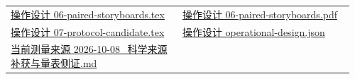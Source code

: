 \documentclass[11pt,a4paper]{article}
\begin{document}
\begin{minipage}{\linewidth}
\begin{tabular}{@{}p{0.48\linewidth}p{0.48\linewidth}@{}}
\href{file:///D:/Agent/srp/agent/design/design-foundation-20261008/06-paired-storyboards.tex}{操作设计 06-\allowbreak{}paired-\allowbreak{}storyboards.tex} & \href{file:///D:/Agent/srp/agent/design/design-foundation-20261008/06-paired-storyboards.pdf}{操作设计 06-\allowbreak{}paired-\allowbreak{}storyboards.pdf}\\[4pt]
\href{file:///D:/Agent/srp/agent/design/design-foundation-20261008/07-protocol-candidate.tex}{操作设计 07-\allowbreak{}protocol-\allowbreak{}candidate.tex} & \href{file:///D:/Agent/srp/agent/design/design-foundation-20261008/operational-design.json}{操作设计 operational-\allowbreak{}design.json}\\[4pt]
\href{file:///D:/Agent/srp/agent/work/2026-10-08_\%E7\%A7\%91\%E5\%AD\%A6\%E6\%9D\%A5\%E6\%BA\%90\%E8\%A1\%A5\%E8\%8E\%B7\%E4\%B8\%8E\%E9\%87\%8F\%E8\%A1\%A8\%E4\%BE\%A7\%E8\%AF\%81.md}{当前测量来源 2026-\allowbreak{}10-\allowbreak{}08\_\allowbreak{}科学来源补获与量表侧证.md} & \\[4pt]
\end{tabular}\endgroup\end{minipage}\par
\end{document}
